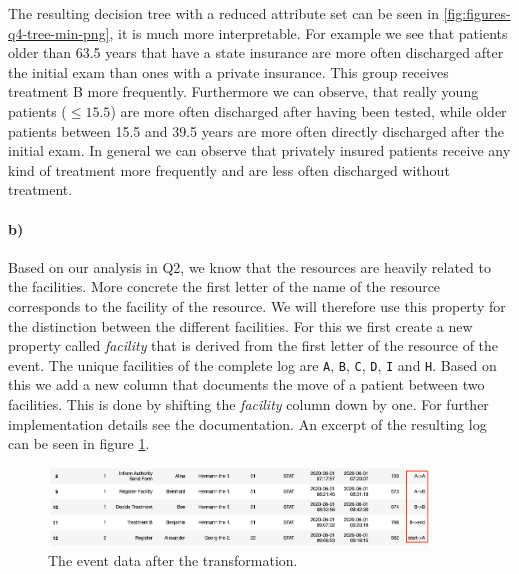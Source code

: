 \documentclass[12pt]{report}
\begin{document}
The resulting decision tree with a reduced attribute set can be seen in \ref{fig:figures-q4-tree-min-png}, it is much more interpretable. For example we see that patients older than 63.5 years that have a state insurance are more often discharged after the initial exam than ones with a private insurance. This group receives treatment B more frequently.
Furthermore we can observe, that really young patients ($\leq15.5$) are more often discharged after having been tested, while older patients between 15.5 and 39.5 years are more often directly discharged after the initial exam.
In general we can observe that privately insured patients receive any kind of treatment more frequently and are less often discharged without treatment.

\paragraph{b)} 
Based on our analysis in Q2, we know that the resources are heavily related to the facilities. More concrete the first letter of the name of the resource corresponds to the facility of the resource. We will therefore use this property for the distinction between the different facilities.
For this we first create a new property called \emph{facility} that is derived from the first letter of the resource of the event. The unique facilities of the complete log are \texttt{A}, \texttt{B}, \texttt{C}, \texttt{D}, \texttt{I} and \texttt{H}. Based on this we add a new column that documents the move of a patient between two facilities. This is done by shifting the \emph{facility} column down by one. For further implementation details see the documentation. An excerpt of the resulting log can be seen in figure \ref{fig:figures-q4-fac-move-png}.

\begin{figure}[h]
    \centering
    \includegraphics[width=0.9\textwidth]{figures/q4_fac_move.png}
    \caption{The event data after the transformation.}
    \label{fig:figures-q4-fac-move-png}
\end{figure}
\end{document}
